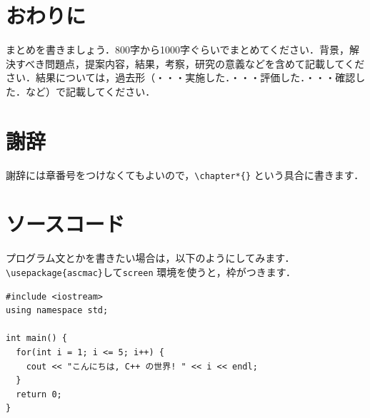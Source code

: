 \documentclass[a4paper,11pt,uplatex]{ujreport}
\begin{document}
\chapter{おわりに}
\label{chap:おわりに}

まとめを書きましょう．800字から1000字ぐらいでまとめてください．背景，解決すべき問題点，提案内容，結果，考察，研究の意義などを含めて記載してください．結果については，過去形（・・・実施した．・・・評価した．・・・確認した．など）で記載してください．\par

\chapter*{謝辞}
\label{sec:Acknowledgments}

謝辞には章番号をつけなくてもよいので，\verb|\chapter*{}| という具合に書きます．

\appendix
\chapter{ソースコード}
\label{apndx:src}

プログラム文とかを書きたい場合は，以下のようにしてみます．\verb|\usepackage{ascmac}|して\verb|screen| 環境を使うと，枠がつきます．

\begin{screen}\begin{verbatim}
#include <iostream>
using namespace std;

int main() {
  for(int i = 1; i <= 5; i++) {
    cout << "こんにちは, C++ の世界! " << i << endl;
  }
  return 0;
}
\end{verbatim}\end{screen}
\end{document}
